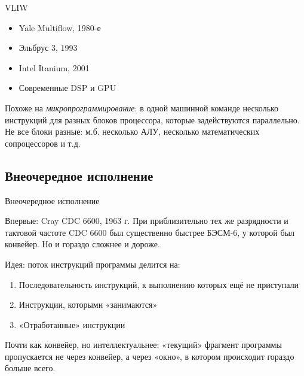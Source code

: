 \documentclass[xetex,aspectratio=43]{beamer}
\begin{document}
\begin{frame}{VLIW}

    \begin{itemize}
        \item Yale Multiflow, 1980-е
        \item Эльбрус 3, 1993
        \item Intel Itanium, 2001
        \item Современные DSP и GPU
    \end{itemize}

    Похоже на \emph{микропрограммирование}: в одной машинной команде несколько инструкций для разных блоков процессора, которые задействуются параллельно. Не все блоки разные: м.б. несколько АЛУ, несколько математических сопроцессоров и т.д.
\end{frame}

\subsection{Внеочередное исполнение}

\begin{frame}{Внеочередное исполнение}

    Впервые: Cray CDC 6600, 1963 г. При приблизительно тех же разрядности и
    тактовой частоте CDC 6600 был существенно быстрее БЭСМ-6, у которой был
    конвейер. Но и гораздо сложнее и дороже.

    Идея: поток инструкций программы делится на:

    \begin{enumerate}
        \tightlist
        \item
        Последовательность инструкций, к выполнению которых ещё не приступали
        \item
        Инструкции, которыми «занимаются»
        \item
        «Отработанные» инструкции
    \end{enumerate}

    \pause

    Почти как конвейер, но интеллектуальнее: «текущий» фрагмент программы
    пропускается не через конвейер, а через «окно», в котором происходит
    гораздо больше всего.
\end{frame}
\end{document}
